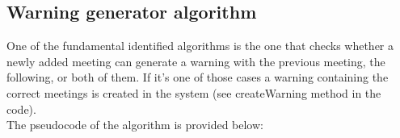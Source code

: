 \subsection{Warning generator algorithm}

One of the fundamental identified algorithms is the one that checks whether a newly added meeting can generate a warning with the previous meeting, the following, or both of them.
If it's one of those cases a warning containing the correct meetings is created in the system (see createWarning method in the code).
\\
The pseudocode of the algorithm is provided below:
\\



